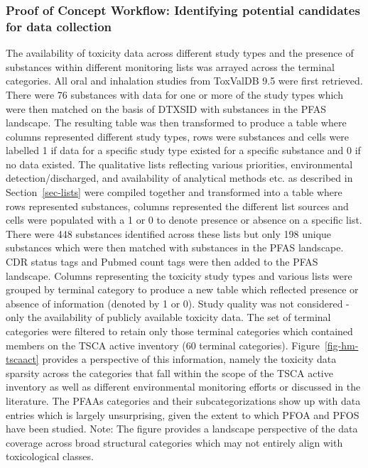 \documentclass[
  super,
  preprint,
  3p]{elsarticle}
\begin{document}
\hypertarget{proof-of-concept-workflow-identifying-potential-candidates-for-data-collection}{%
\subsubsection{Proof of Concept Workflow: Identifying potential
candidates for data
collection}\label{proof-of-concept-workflow-identifying-potential-candidates-for-data-collection}}

The availability of toxicity data across different study types and the
presence of substances within different monitoring lists was arrayed
across the terminal categories. All oral and inhalation studies from
ToxValDB 9.5 were first retrieved. There were 76 substances with data
for one or more of the study types which were then matched on the basis
of DTXSID with substances in the PFAS landscape. The resulting table was
then transformed to produce a table where columns represented different
study types, rows were substances and cells were labelled 1 if data for
a specific study type existed for a specific substance and 0 if no data
existed. The qualitative lists reflecting various priorities,
environmental detection/discharged, and availability of analytical
methods etc. as described in Section~\ref{sec-lists} were compiled
together and transformed into a table where rows represented substances,
columns represented the different list sources and cells were populated
with a 1 or 0 to denote presence or absence on a specific list. There
were 448 substances identified across these lists but only 198 unique
substances which were then matched with substances in the PFAS
landscape. CDR status tags and Pubmed count tags were then added to the
PFAS landscape. Columns representing the toxicity study types and
various lists were grouped by terminal category to produce a new table
which reflected presence or absence of information (denoted by 1 or 0).
Study quality was not considered - only the availability of publicly
available toxicity data. The set of terminal categories were filtered to
retain only those terminal categories which contained members on the
TSCA active inventory (60 terminal categories).
Figure~\ref{fig-hm-tscaact} provides a perspective of this information,
namely the toxicity data sparsity across the categories that fall within
the scope of the TSCA active inventory as well as different
environmental monitoring efforts or discussed in the literature. The
PFAAs categories and their subcategorizations show up with data entries
which is largely unsurprising, given the extent to which PFOA and PFOS
have been studied. Note: The figure provides a landscape perspective of
the data coverage across broad structural categories which may not
entirely align with toxicological classes.
\end{document}
